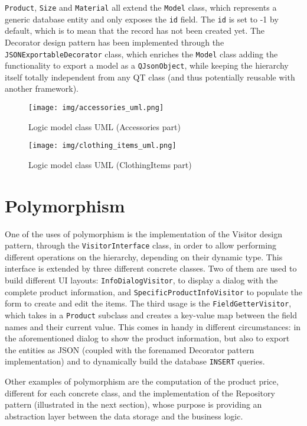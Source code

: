 \documentclass[10pt]{article}
\begin{document}
\texttt{Product},
\texttt{Size} and \texttt{Material} all extend the \texttt{Model} class, which
represents a generic database entity and only exposes the \texttt{id} field.
The \texttt{id} is set to -1 by default, which is to mean that the record has
not been created yet. The Decorator design pattern has been implemented through
the \texttt{JSONExportableDecorator} class, which enriches the \texttt{Model}
class adding the functionality to export a model as a \texttt{QJsonObject},
while keeping the hierarchy itself totally independent from any QT class (and
thus potentially reusable with another framework).
\begin{figure}
    \centering
    \texttt{[image: img/accessories\_uml.png]}
    \caption{Logic model class UML (Accessories part)}
    \label{fig:accessoriesUML}
\end{figure}
\begin{figure}
    \centering
    \texttt{[image: img/clothing\_items\_uml.png]}
    \caption{Logic model class UML (ClothingItems part)}
    \label{fig:clothingItemsUML}
\end{figure}
\pagebreak

\section{Polymorphism}
One of the uses of polymorphism is the implementation of the Visitor design
pattern, through the \texttt{VisitorInterface} class, in order to allow
performing different operations on the hierarchy, depending on their dynamic
type. This interface is extended by three different concrete classes. Two of
them are used to build different UI layouts: \texttt{InfoDialogVisitor}, to
display a dialog with the complete product information, and
\texttt{SpecificProductInfoVisitor} to populate the form to create and edit the
items. The third usage is the \texttt{FieldGetterVisitor}, which takes in a
\texttt{Product} subclass and creates a key-value map between the field names
and their current value. This comes in handy in different circumstances: in the
aforementioned dialog to show the product information, but also to export the
entities as JSON (coupled with the forenamed Decorator pattern implementation)
and to dynamically build the database \texttt{INSERT} queries.

Other examples of polymorphism are the computation of the product price,
different for each concrete class, and the implementation of the Repository
pattern (illustrated in the next section), whose purpose is providing an
abstraction layer between the data storage and the business logic.
\end{document}
